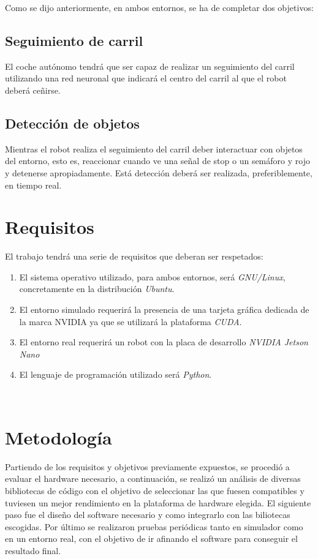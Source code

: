 Como se dijo anteriormente, en ambos entornos, se ha de completar dos objetivos:

\subsection{Seguimiento de carril}
El coche autónomo tendrá que ser capaz de realizar un seguimiento del carril utilizando una red neuronal que indicará el centro del carril al que el robot deberá ceñirse.\\

\subsection{Detección de objetos}
Mientras el robot realiza el seguimiento del carril deber interactuar con objetos del entorno, esto es, reaccionar cuando ve una señal de stop o un semáforo y rojo y detenerse apropiadamente. Está detección deberá ser realizada, preferiblemente, en tiempo real.\\

\section{Requisitos}
\label{sec:requisitos}
El trabajo tendrá una serie de requisitos que deberan ser respetados:
\begin{enumerate}
	\item El sistema operativo utilizado, para ambos entornos, será \textit{GNU/Linux}, concretamente en la distribución \textit{Ubuntu}.
	\item El entorno simulado requerirá la presencia de una tarjeta gráfica dedicada de la marca NVIDIA ya que se utilizará la plataforma \textit{CUDA}.
  \item El entorno real requerirá un robot con la placa de desarrollo \textit{NVIDIA Jetson Nano}
  \item El lenguaje de programación utilizado será \textit{Python}.
\end{enumerate}\


\section{Metodología}
\label{sec:metodologia}
Partiendo de los requisitos y objetivos previamente expuestos, se procedió a evaluar el hardware necesario, a continuación, se realizó un análisis de diversas bibliotecas de código con el objetivo de seleccionar las que fuesen compatibles y tuviesen un mejor rendimiento en la plataforma de hardware elegida. El siguiente paso fue el diseño del software necesario y como integrarlo con las biliotecas escogidas. Por último se realizaron pruebas periódicas tanto en simulador como en un entorno real, con el objetivo de ir afinando el software para conseguir el resultado final.\\

